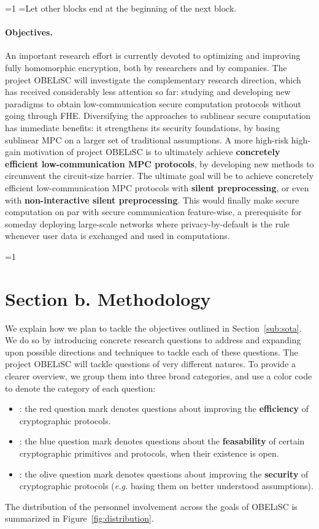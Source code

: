 \documentclass[oneside, a4paper, onecolumn, 11pt]{article}
\newcommand{\OBELiSC}{\textsc{OBELiSC}\xspace}
\newcounter{alphasect}
\def\alphainsection{0}
\let\oldsection=\section
\def\section{%
  \ifnum\alphainsection=1%
    \addtocounter{alphasect}{1}
  \fi%
\oldsection}%
\newenvironment{alphasection}{%
  \ifnum\alphainsection=1%
    \errhelp={Let other blocks end at the beginning of the next block.}
    \errmessage{Nested Alpha section not allowed}
  \fi%
  \setcounter{alphasect}{0}
  \def\alphainsection{1}
}{%
  \setcounter{alphasect}{0}
  \def\alphainsection{0}
}%
\begin{document}
\begin{alphasection}
\paragraph{Objectives.} An important research effort is currently devoted to optimizing and improving fully homomorphic encryption, both by researchers and by companies. The project \OBELiSC will investigate the complementary research direction, which has received considerably less attention so far: studying and developing new paradigms to obtain low-communication secure computation protocols without going through FHE. Diversifying the approaches to sublinear secure computation has immediate benefits: it strengthens its security foundations, by basing sublinear MPC on a larger set of traditional assumptions. A more high-risk high-gain motivation of project \OBELiSC is to ultimately achieve \textbf{concretely efficient low-communication MPC protocols}, by developing new methods to circumvent the circuit-size barrier. The ultimate goal will be to achieve concretely efficient low-communication MPC protocols with \textbf{silent preprocessing}, or even with \textbf{non-interactive silent preprocessing}. This would finally make secure computation on par with secure communication feature-wise, a prerequisite for someday deploying large-scale networks where privacy-by-default is the rule whenever user data is exchanged and used in computations.

\section*{Section b. Methodology}
\setcounter{subsection}{0}

We explain how we plan to tackle the objectives outlined in Section~\ref{sub:sota}. We do so by introducing concrete research questions to address and expanding upon possible directions and techniques to tackle each of these questions. The project \OBELiSC will tackle questions of very different natures. To provide a clearer overview, we group them into three broad categories, and use a color code to denote the category of each question:\\[-.3cm]

\begin{itemize}[leftmargin=+.3in]
    \item[\textcolor{purple}{\faQuestionCircle}]: the red question mark denotes questions about improving the \textbf{efficiency} of cryptographic protocols.
    \item[\textcolor{blue}{\faQuestionCircle}]: the blue question mark denotes questions about the \textbf{feasability} of certain cryptographic primitives and protocols, when their existence is open.
    \item[\textcolor{olive}{\faQuestionCircle}]: the olive question mark denotes questions about improving the \textbf{security} of cryptographic protocols (\emph{e.g.} basing them on better understood assumptions).
\end{itemize}
The distribution of the personnel involvement across the goals of \OBELiSC is summarized in Figure~\ref{fig:distribution}.


\end{alphasection}
\end{document}
